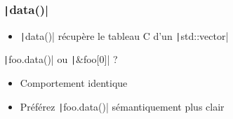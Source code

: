 \documentclass[C++.tex]{subfiles}
\begin{document}
\begin{frame}[fragile]
	\frametitle{\texttt|data()|}
	\begin{itemize}
		\item \texttt|data()| récupère le \og tableau C\fg{} d'un \texttt|std::vector|
	\end{itemize}

	\begin{block}{\texttt|foo.data()| ou \texttt|&foo[0]| ?}
		\begin{itemize}
			\item Comportement identique
			\item Préférez \texttt|foo.data()| sémantiquement plus clair
		\end{itemize}
	\end{block}
\end{frame}
\end{document}
